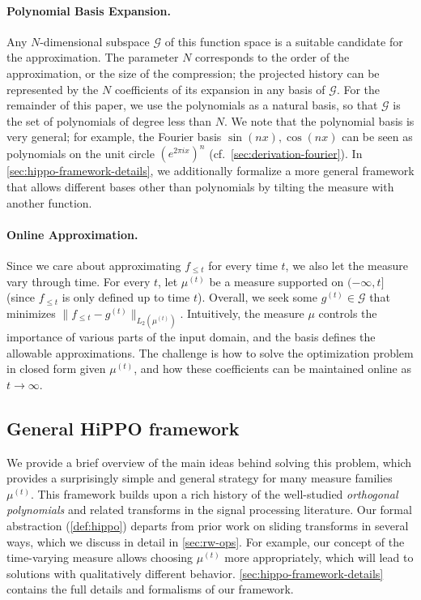 \paragraph{Polynomial Basis Expansion.}
Any $N$-dimensional subspace $\mathcal{G}$ of this function space is a suitable candidate for the approximation.
The parameter $N$ corresponds to the order of the approximation, or the size of the compression;
the projected history can be represented by the $N$ coefficients of its expansion in any basis of $\mathcal{G}$.
For the remainder of this paper, we use the polynomials as a natural basis, so that $\mathcal{G}$ is the set of polynomials of degree less than $N$.
We note that the polynomial basis is very general; for example, the Fourier basis $\sin(nx), \cos(nx)$ can be seen as polynomials on the unit circle $(e^{2\pi i x})^n$ (cf.\ \cref{sec:derivation-fourier}).
In \cref{sec:hippo-framework-details}, we additionally formalize a more
general framework that allows different bases other than polynomials by tilting the measure with another function.

\paragraph{Online Approximation.}
Since we care about approximating $f_{\le t}$ for every time $t$, we also let the measure vary through time.
For every $t$, let $\mu^{(t)}$ be a measure supported on $(-\infty, t]$ (since $f_{\le t}$ is only defined up to time $t$).
Overall, we seek some $g^{(t)}\in\mathcal{G}$ that minimizes $\|f_{\le t} - g^{(t)}\|_{L_2(\mu^{(t)})}$.
Intuitively, the measure $\mu$ controls the importance of various parts of the input domain,
and the basis defines the allowable approximations.
The challenge is how to solve the optimization problem in closed form given $\mu^{(t)}$,
and how these coefficients can be maintained online as $t \to \infty$.




\subsection{General HiPPO framework}
\label{subsec:hippo-framework}

We provide a brief overview of the main ideas behind solving this problem, which provides a surprisingly simple and general strategy for many measure families $\mu^{(t)}$.
This framework builds upon a rich history of the well-studied \emph{orthogonal polynomials} and related transforms in the signal processing literature.
Our formal abstraction (\cref{def:hippo}) departs from prior work on sliding transforms in several ways, which we discuss in detail in \cref{sec:rw-ops}.
For example, our concept of the time-varying measure allows choosing $\mu^{(t)}$ more appropriately, which will lead to solutions with qualitatively different behavior.
\cref{sec:hippo-framework-details} contains the full details and formalisms of our framework.


